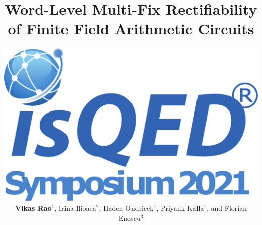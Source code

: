\documentclass[xcolor=dvipsnames]{beamer}
\title[]{Word-Level Multi-Fix Rectifiability of Finite Field Arithmetic Circuits}
\author[]{
\includegraphics[scale=0.10]{ISQED_logo.pdf}\\
 {\bf Vikas Rao$^1$}, Irina Ilioaea$^2$, Haden Ondricek$^1$, 
Priyank Kalla$^1$,  and Florian Enescu$^3$}
\institute[]{
$^1$Electrical \& Computer Engineering, University of Utah\\
$^2$Department of Mathematics, Louisiana State University Shreveport\\
$^3$Mathematics \& Statistics, Georgia State University
}
\date{}
\begin{document}
\begin{frame}[plain]
  \titlepage
\end{frame}










% 


\end{document}

